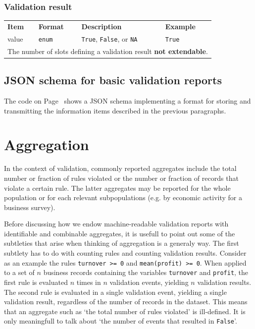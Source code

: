 \documentclass[a4paper, 11pt]{article}
\newcommand{\code}[1]{\texttt{#1}}
\newcommand{\waar}{{\normalfont \texttt{True}}}
\newcommand{\onwaar}{{\normalfont \texttt{False}}}
\newcommand{\na}{{\normalfont \texttt{NA}}}
\begin{document}
\subsubsection{Validation result}

\begin{center}
\begin{tabular}{|lp{15mm}p{}p{}|}
\hline
\textbf{Item} & \textbf{Format} & \textbf{Description} &\textbf{Example}\\
value  & \code{enum} & \waar{}, \onwaar{}, or \na{}    &\waar{}\\
\hline
\multicolumn{4}{|l|}{The number of slots defining a validation result \textbf{not extendable}.
}\\
\hline
\end{tabular}
\end{center}

\subsection{JSON schema for basic validation reports}
The code on Page~\pageref{code:basicreport} shows a JSON schema implementing
a format for storing and transmitting the information items described in the previous
paragraphs. 

\newpage
\label{code:basicreport}


\section{Aggregation}
In the context of validation, commonly reported aggregates include the total
number or fraction of rules violated or the number or fraction of records  that
violate a certain rule. The latter aggregates may be reported for the whole
population or for each relevant subpopulations (e.g. by economic activity for a
business survey). 


Before discussing how we endow machine-readable validation reports with
identifiable and combinable aggregates, it is usefull to point out some of the
subtleties that arise when thinking of aggregation is a generaly way. The first
subtlety has to do with counting rules and counting validation results.
Consider as an example the rules \code{turnover >= 0} and \code{mean(profit) >=
0}.  When applied to a set of $n$ business records containing the variables
\code{turnover} and \code{profit}, the first rule is evaluated $n$ times in $n$
validation events, yielding $n$ validation results. The second rule is
evaluated in a single validation event, yielding a single validation result,
regardless of the number of records in the dataset. This means that an
aggregate such as `the total number of rules violated' is ill-defined. It is
only meaningfull to talk about `the number of events that resulted in
\onwaar{}'. 
\end{document}

